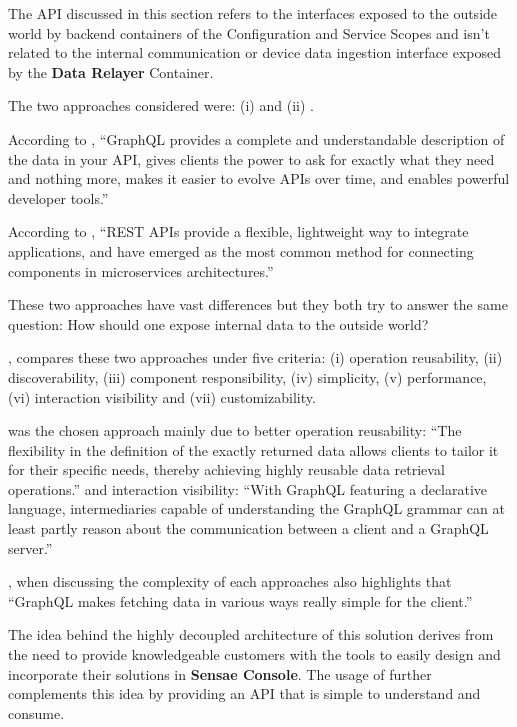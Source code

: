 The \gls{API} discussed in this section refers to the interfaces exposed to the outside world by backend containers of the Configuration and Service Scopes and isn't related to the internal communication or device data ingestion interface exposed by the \textbf{Data Relayer} Container.

The two approaches considered were: (i)  and (ii) .

According to \cite{graphql}, ``GraphQL provides a complete and understandable description of the data in your API, gives clients the power to ask for exactly what they need and nothing more, makes it easier to evolve APIs over time, and enables powerful developer tools.''

According to \cite{rest}, ``REST APIs provide a flexible, lightweight way to integrate applications, and have emerged as the most common method for connecting components in microservices architectures.''
 
These two approaches have vast differences but they both try to answer the same question: How should one expose internal data to the outside world?

\cite{eizinger2017api}, compares these two approaches under five criteria: (i) operation reusability, (ii) discoverability, (iii) component responsibility, (iv) simplicity, (v) performance, (vi) interaction visibility and (vii) customizability.

 was the chosen approach mainly due to better operation reusability: ``The flexibility in the definition of the exactly returned data allows clients to tailor it for their specific needs, thereby achieving highly reusable data retrieval operations.'' and interaction visibility: ``With GraphQL featuring a declarative language, intermediaries capable of understanding the GraphQL grammar can at least partly reason about the communication between a client and a GraphQL server.''

\cite{eizinger2017api}, when discussing the complexity of each approaches also highlights that ``GraphQL makes fetching data in various ways really simple for the client.''

The idea behind the highly decoupled architecture of this solution derives from the need to provide knowledgeable customers with the tools to easily design and incorporate their solutions in \textbf{Sensae Console}. The usage of  further complements this idea by providing an API that is simple to understand and consume.

